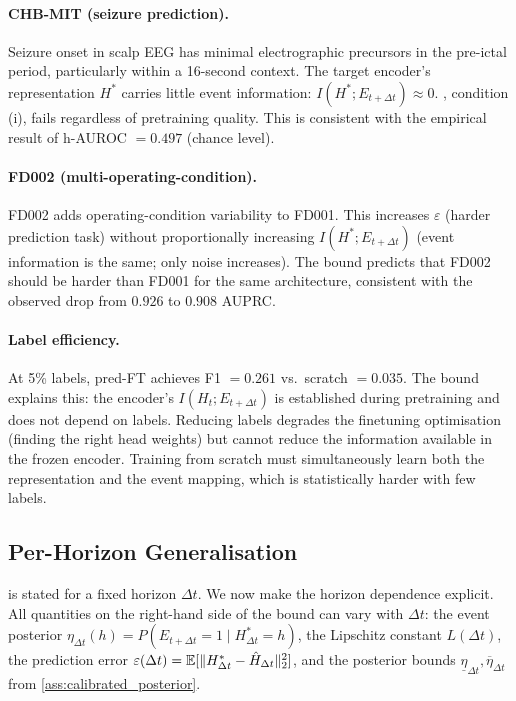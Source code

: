 \paragraph{CHB-MIT (seizure prediction).}
Seizure onset in scalp EEG has minimal electrographic precursors in the pre-ictal period, particularly within a 16-second context.
The target encoder's representation $H^*$ carries little event information: $I(H^*; E_{t+\Delta t}) \approx 0$.
, condition (i), fails regardless of pretraining quality.
This is consistent with the empirical result of h-AUROC $= 0.497$ (chance level).

\paragraph{FD002 (multi-operating-condition).}
FD002 adds operating-condition variability to FD001. This increases $\varepsilon$ (harder prediction task) without proportionally increasing $I(H^*; E_{t+\Delta t})$ (event information is the same; only noise increases). The bound predicts that FD002 should be harder than FD001 for the same architecture, consistent with the observed drop from $0.926$ to $0.908$ AUPRC.

\paragraph{Label efficiency.}
At 5\% labels, pred-FT achieves F1 $= 0.261$ vs.\ scratch $= 0.035$.
The bound explains this: the encoder's $I(H_t; E_{t+\Delta t})$ is established during pretraining and does not depend on labels. Reducing labels degrades the finetuning optimisation (finding the right head weights) but cannot reduce the information available in the frozen encoder. Training from scratch must simultaneously learn both the representation and the event mapping, which is statistically harder with few labels.

\subsection{Per-Horizon Generalisation}
\label{app:per_horizon}

 is stated for a fixed horizon $\Delta t$. We now make the horizon dependence explicit. All quantities on the right-hand side of the bound can vary with $\Delta t$: the event posterior $\eta_{\Delta t}(h) = P(E_{t+\Delta t}=1 \mid H^*_{\Delta t}=h)$, the Lipschitz constant $L(\Delta t)$, the prediction error $\varepsilon(\Delta t) = \mathbb{E}[\|H^*_{\Delta t} - \hat{H}_{\Delta t}\|_2^2]$, and the posterior bounds $\underline{\eta}_{\Delta t}, \overline{\eta}_{\Delta t}$ from \ref{ass:calibrated_posterior}.

